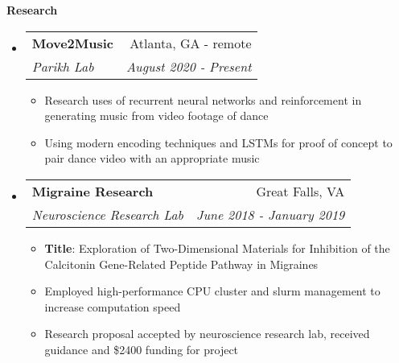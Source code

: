 \documentclass[letterpaper,10pt]{article}
\makeatletter
\newcommand{\resitem}[1]{\item #1 \vspace{-3.5pt}}
\newcommand{\resheading}[1]{{\large \colorbox{mygrey}{\begin{minipage}{\textwidth}{\textbf{#1 \vphantom{p\^{E}}}}\end{minipage}}}}
\newcommand{\ressubheading}[4]{
\begin{tabular*}{7.0in}{l@{\extracolsep{\fill}}r}
		\textbf{#1} & #2 \\
		\textit{#3} & \textit{#4} \\
\end{tabular*}\vspace{-6pt}}
\makeatother
\begin{document}

\resheading{Research}
\begin{itemize}
\item
    \ressubheading{Move2Music}{Atlanta, GA - remote}{Parikh Lab}{August 2020 - Present}
    \begin{itemize}
        \resitem{Research uses of recurrent neural networks and reinforcement in generating music from video footage of dance}
        \resitem{Using modern encoding techniques and LSTMs for proof of concept to pair dance video with an appropriate music}
    \end{itemize}
\item
	\ressubheading{Migraine Research}{Great Falls, VA}{Neuroscience Research Lab}{June 2018 - January 2019}
	\begin{itemize}
		\resitem{\textbf{Title}: Exploration of Two-Dimensional Materials for Inhibition of the Calcitonin Gene-Related Peptide Pathway in Migraines}
	    \resitem{Employed high-performance CPU cluster and slurm management to increase computation speed}
	    \resitem{Research proposal accepted by neuroscience research lab, received guidance and \$2400 funding for project}
	\end{itemize}
	
\end{itemize}
\end{document}
